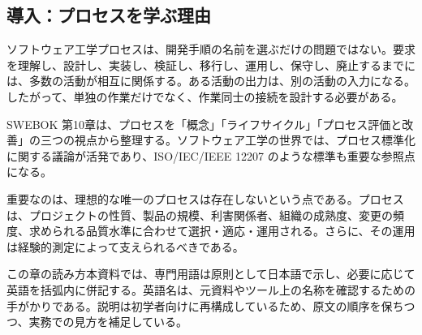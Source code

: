 \subsection{導入：プロセスを学ぶ理由}
ソフトウェア工学プロセスは、開発手順の名前を選ぶだけの問題ではない。要求を理解し、設計し、実装し、検証し、移行し、運用し、保守し、廃止するまでには、多数の活動が相互に関係する。ある活動の出力は、別の活動の入力になる。したがって、単独の作業だけでなく、作業同士の接続を設計する必要がある。

SWEBOK 第10章は、プロセスを「概念」「ライフサイクル」「プロセス評価と改善」の三つの視点から整理する。ソフトウェア工学の世界では、プロセス標準化に関する議論が活発であり、ISO/IEC/IEEE 12207 のような標準も重要な参照点になる。

重要なのは、理想的な唯一のプロセスは存在しないという点である。プロセスは、プロジェクトの性質、製品の規模、利害関係者、組織の成熟度、変更の頻度、求められる品質水準に合わせて選択・適応・運用される。さらに、その運用は経験的測定によって支えられるべきである。

\begin{pointbox}{この章の読み方}本資料では、専門用語は原則として日本語で示し、必要に応じて英語を括弧内に併記する。英語名は、元資料やツール上の名称を確認するための手がかりである。説明は初学者向けに再構成しているため、原文の順序を保ちつつ、実務での見方を補足している。\end{pointbox}
